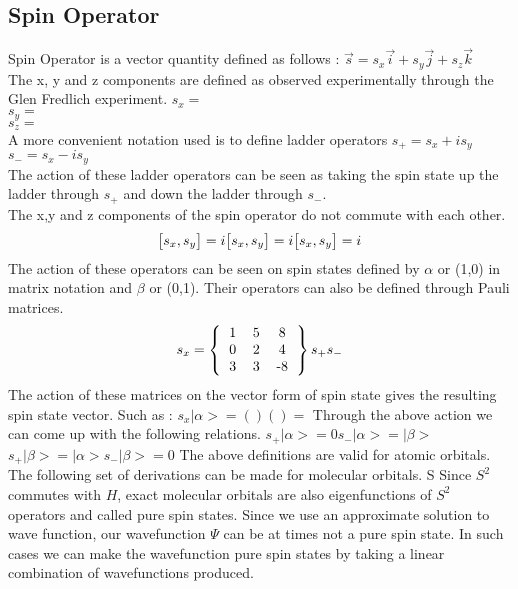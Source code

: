 \documentclass[11pt]{article}   	%
\begin{document}
\subsection{Spin Operator}
	Spin Operator is a vector quantity defined as follows :
	$\vec{s}=s_x \vec{i}+s_y\vec{j} + s_z\vec{k}$\\
	The x, y and z components are defined as observed experimentally through the Glen Fredlich experiment. 
	$s_x=$\\
	$s_y=$\\
	$s_z=$\\
	A more convenient notation used is to define ladder operators
	$s_+=s_x+is_y$\\
	$s_-=s_x-is_y$\\
	The action of these ladder operators can be seen as taking the spin state up the ladder through $s_+$ and down the ladder through $s_-$.\\
	The x,y and z components of the spin operator do not commute with each other.\\
	\begin{equation}
		\big[s_x,s_y\big]=i\\
		\big[s_x,s_y\big]=i\\
		\big[s_x,s_y\big]=i\\
	\end{equation}
	The action of these operators can be seen on spin states defined by $\alpha$ or (1,0) in matrix notation  and $\beta$ or (0,1).	
	Their operators can also be defined through Pauli matrices.
	\begin{equation}
	s_x=\left \{
	  \begin{tabular}{ccc}
	  1 & 5 & 8 \\
	  0 & 2 & 4 \\
	  3 & 3 & -8 
	  \end{tabular}
	\right \}
	s_+
	s_-
	\end{equation}
	The action of these matrices on the vector form of spin state gives the resulting spin state vector. Such as :
	$s_x |\alpha>=()()=$
	Through the above action we can come up with the following relations. 
	$s_+|\alpha>=0  s_-|\alpha>=|\beta>$
	$s_+|\beta>=|\alpha>  s_-|\beta>=0$
	The above definitions are valid for atomic orbitals. The following set of derivations  can be made for molecular orbitals. 
	S	
	Since $S^2$ commutes with $H$, exact molecular orbitals are also eigenfunctions of $S^2$ operators and called pure spin states. Since we use an approximate solution
	to wave function, our wavefunction $\Psi$ can be at times not a pure spin state. In such cases we can make the wavefunction pure spin states by taking a linear combination
	of wavefunctions produced. 
\end{document}
